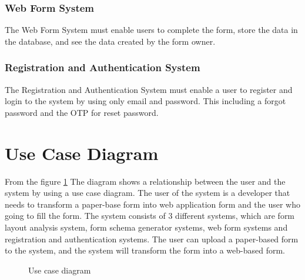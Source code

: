 \documentclass[12pt,oneside,openright,a4paper]{cpe-english-project}
\begin{document}
\subsubsection{Web Form System}

The Web Form System must enable users to complete the form, store the data in the database, and see the data created by the form owner.

\subsubsection{Registration and Authentication System}

The Registration and Authentication System must enable a user to register and login to the system by using only email and password. This including a forgot password and the  OTP for reset password.


\section{Use Case Diagram}

From the figure \ref{fig:use-case} The diagram shows a relationship between the user and the system by using a use case diagram. The user of the system is a developer that needs to transform a paper-base form into web application form and the user who going to fill the form. The system consists of 3 different systems, which are form layout analysis system, form schema generator systems, web form systems and registration and authentication systems. The user can upload a paper-based form to the system, and the system will transform the form into a web-based form.

\begin{figure}[!h]
\centering
{}
\caption{Use case diagram}\label{fig:use-case}
\end{figure}
\end{document}

